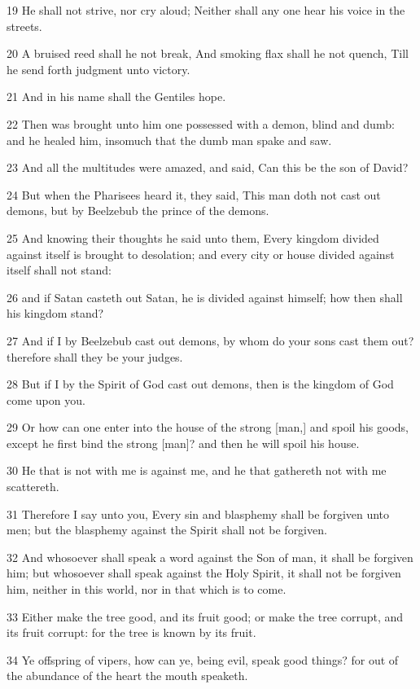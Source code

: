 \par 19 He shall not strive, nor cry aloud; Neither shall any one hear his voice in the streets.
\par 20 A bruised reed shall he not break, And smoking flax shall he not quench, Till he send forth judgment unto victory.
\par 21 And in his name shall the Gentiles hope.
\par 22 Then was brought unto him one possessed with a demon, blind and dumb: and he healed him, insomuch that the dumb man spake and saw.
\par 23 And all the multitudes were amazed, and said, Can this be the son of David?
\par 24 But when the Pharisees heard it, they said, This man doth not cast out demons, but by Beelzebub the prince of the demons.
\par 25 And knowing their thoughts he said unto them, Every kingdom divided against itself is brought to desolation; and every city or house divided against itself shall not stand:
\par 26 and if Satan casteth out Satan, he is divided against himself; how then shall his kingdom stand?
\par 27 And if I by Beelzebub cast out demons, by whom do your sons cast them out? therefore shall they be your judges.
\par 28 But if I by the Spirit of God cast out demons, then is the kingdom of God come upon you.
\par 29 Or how can one enter into the house of the strong [man,] and spoil his goods, except he first bind the strong [man]? and then he will spoil his house.
\par 30 He that is not with me is against me, and he that gathereth not with me scattereth.
\par 31 Therefore I say unto you, Every sin and blasphemy shall be forgiven unto men; but the blasphemy against the Spirit shall not be forgiven.
\par 32 And whosoever shall speak a word against the Son of man, it shall be forgiven him; but whosoever shall speak against the Holy Spirit, it shall not be forgiven him, neither in this world, nor in that which is to come.
\par 33 Either make the tree good, and its fruit good; or make the tree corrupt, and its fruit corrupt: for the tree is known by its fruit.
\par 34 Ye offspring of vipers, how can ye, being evil, speak good things? for out of the abundance of the heart the mouth speaketh.
